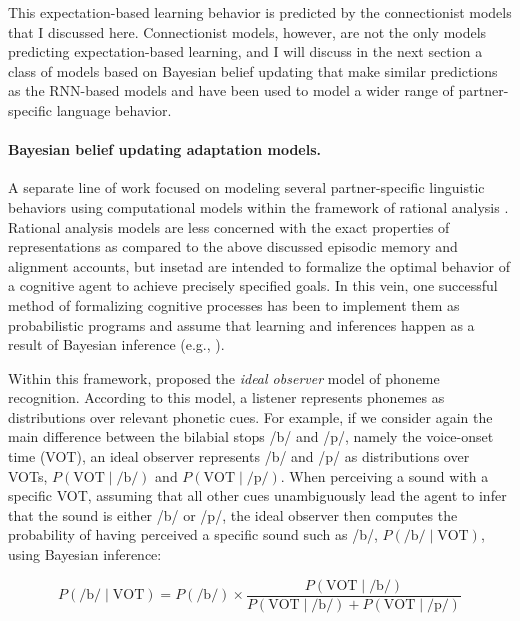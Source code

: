 This expectation-based learning behavior is predicted by the connectionist models that I discussed here. Connectionist models, however, are not the only models predicting expectation-based learning, and I will discuss in the next section a class of models based on Bayesian belief updating that make similar predictions as the RNN-based models and have been used to model a wider range of partner-specific language behavior.

\paragraph{Bayesian belief updating adaptation models.} A separate line of work focused on modeling several partner-specific linguistic behaviors using computational models within 
the framework of rational analysis \cite{Marr1982,Anderson1990}. Rational analysis models are less concerned with the exact properties of representations as 
compared to the above discussed episodic memory and alignment accounts, but insetad are intended to formalize the optimal behavior of a cognitive agent to achieve 
precisely specified goals. In this vein, one successful method of formalizing cognitive processes has been to implement them as probabilistic programs and assume that learning
and inferences happen as a result of Bayesian inference (e.g., \cite{Tenenbaum2011}). 

Within this framework, \cite{Clayards2008} proposed the \textit{ideal observer} model of phoneme recognition. According to this model, a listener represents phonemes as distributions
over relevant phonetic cues. For example, if we consider again the main difference between the bilabial stops /b/ and /p/, namely the voice-onset time (VOT), an ideal observer represents 
/b/ and /p/ as distributions over VOTs, $P(\mbox{VOT}\mid \mbox{/b/})$ and $P(\mbox{VOT}\mid \mbox{/p/})$. When perceiving a sound with a specific VOT, assuming that all other cues 
unambiguously lead the agent to infer that the sound is either /b/ or /p/, the ideal observer then computes the probability of
having perceived a specific sound such as /b/, $P(\mbox{/b/} \mid \mbox{VOT})$, using Bayesian inference:

$$ P(\mbox{/b/} \mid \mbox{VOT}) = P(\mbox{/b/}) \times \frac{P(\mbox{VOT}\mid \mbox{/b/})}{P(\mbox{VOT}\mid \mbox{/b/}) + P(\mbox{VOT}\mid \mbox{/p/})}   $$

